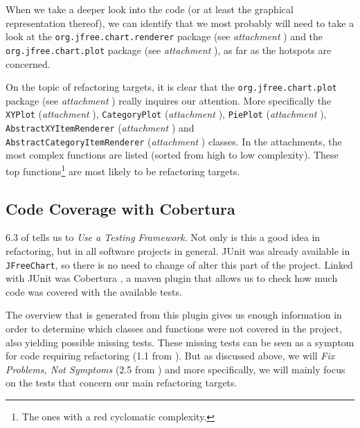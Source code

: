 \documentclass[11pt]{article}
\begin{document}
	When we take a deeper look into the code (or at least the graphical representation thereof), we can identify that we most probably will need to take a look at the \texttt{org.jfree.chart.renderer} package (see \textsl{attachment \pageref{hotspots-package-renderer}}) and the \texttt{org.jfree.chart.plot} package (see \textsl{attachment \pageref{hotspots-package-plot}}), as far as the hotspots are concerned.
	
	On the topic of refactoring targets, it is clear that the \texttt{org.jfree.chart.plot} package (see \textsl{attachment \pageref{refactoring-package-plot}}) really inquires our attention. More specifically the \texttt{XYPlot} (\textsl{attachment \pageref{refactoring-XYPlot}}), \texttt{CategoryPlot} (\textsl{attachment \pageref{refactoring-CategoryPlot}}), \texttt{PiePlot} (\textsl{attachment \pageref{refactoring-PiePlot}}), \texttt{AbstractXYItemRenderer} (\textsl{attachment \pageref{refactoring-AbstractXYItemRenderer}}) and\\ \texttt{AbstractCategoryItemRenderer} (\textsl{attachment \pageref{refactoring-AbstractCategoryItemRenderer}}) classes. In the attachments, the most complex functions are listed (sorted from high to low complexity). These top functions\footnote{The ones with a red cyclomatic complexity.} are most likely to be refactoring targets.
	
	\subsection{Code Coverage with Cobertura}
	\label{sec:coco}
	6.3 of \cite{demeyer2009object} tells us to \textsl{Use a Testing Framework}. Not only is this a good idea in refactoring, but in all software projects in general. JUnit was already available in \texttt{JFreeChart}, so there is no need to change of alter this part of the project. Linked with JUnit was \textsf{Cobertura} \cite{cobertura}, a maven plugin that allows us to check how much code was covered with the available tests.
	
	The overview that is generated from this plugin gives us enough information in order to determine which classes and functions were not covered in the project, also yielding possible missing tests. These missing tests can be seen as a symptom for code requiring refactoring (1.1 from \cite{demeyer2009object}). But as discussed above, we will \textsl{Fix Problems, Not Symptoms} (2.5 from \cite{demeyer2009object}) and more specifically, we will mainly focus on the tests that concern our main refactoring targets.
	
\end{document}
